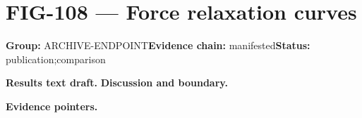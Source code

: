 \clearpage
\section{FIG-108 --- Force relaxation curves}
\label{figpage:fig-108}
\textbf{Group:} ARCHIVE-ENDPOINT\quad \textbf{Evidence chain:} manifested\quad \textbf{Status:} publication;comparison

\textbf{Results text draft.} 
\textbf{Discussion and boundary.} 


\textbf{Evidence pointers.}



\vfill
